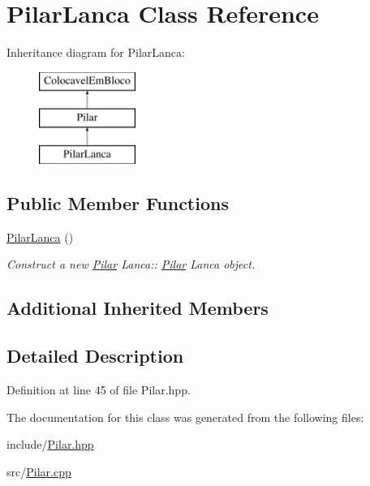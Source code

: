 \hypertarget{class_pilar_lanca}{}\section{Pilar\+Lanca Class Reference}
\label{class_pilar_lanca}
Inheritance diagram for Pilar\+Lanca\+:\begin{figure}[H]
\begin{center}
\leavevmode
\includegraphics[height=3.000000cm]{class_pilar_lanca}
\end{center}
\end{figure}
\subsection*{Public Member Functions}
\begin{DoxyCompactItemize}
\item 
\mbox{\label{class_pilar_lanca_a8763d3329a35b0253460f8d7b4b3fc7a}} 
\mbox{\hyperlink{class_pilar_lanca_a8763d3329a35b0253460f8d7b4b3fc7a}{Pilar\+Lanca}} ()
\begin{DoxyCompactList}\small\item\em Construct a new \mbox{\hyperlink{class_pilar}{Pilar}} Lanca\+:\+: \mbox{\hyperlink{class_pilar}{Pilar}} Lanca object. \end{DoxyCompactList}\end{DoxyCompactItemize}
\subsection*{Additional Inherited Members}


\subsection{Detailed Description}


Definition at line 45 of file Pilar.\+hpp.



The documentation for this class was generated from the following files\+:\begin{DoxyCompactItemize}
\item 
include/\mbox{\hyperlink{_pilar_8hpp}{Pilar.\+hpp}}\item 
src/\mbox{\hyperlink{_pilar_8cpp}{Pilar.\+cpp}}\end{DoxyCompactItemize}
